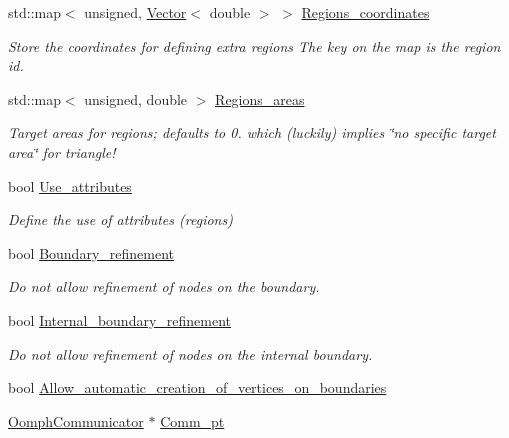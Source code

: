 \begin{DoxyCompactItemize}
std\+::map$<$ unsigned, \hyperlink{classoomph_1_1Vector}{Vector}$<$ double $>$ $>$ \hyperlink{classoomph_1_1TriangleMeshParameters_a6c1715f0b7b47ec999766afde7e85d91}{Regions\+\_\+coordinates}
\begin{DoxyCompactList}\small\item\em Store the coordinates for defining extra regions The key on the map is the region id. \end{DoxyCompactList}\item 
std\+::map$<$ unsigned, double $>$ \hyperlink{classoomph_1_1TriangleMeshParameters_acab056faae14c8124fed117bd24db277}{Regions\+\_\+areas}
\begin{DoxyCompactList}\small\item\em Target areas for regions; defaults to 0. which (luckily) implies \char`\"{}no specific target area\char`\"{} for triangle! \end{DoxyCompactList}\item 
bool \hyperlink{classoomph_1_1TriangleMeshParameters_ace3e9037373f215360c435dc85064db7}{Use\+\_\+attributes}
\begin{DoxyCompactList}\small\item\em Define the use of attributes (regions) \end{DoxyCompactList}\item 
bool \hyperlink{classoomph_1_1TriangleMeshParameters_a0a97e7b7a890c2584206eb6b584ae5f3}{Boundary\+\_\+refinement}
\begin{DoxyCompactList}\small\item\em Do not allow refinement of nodes on the boundary. \end{DoxyCompactList}\item 
bool \hyperlink{classoomph_1_1TriangleMeshParameters_a5d4823276b94bc4b3d4dbbd8d351596c}{Internal\+\_\+boundary\+\_\+refinement}
\begin{DoxyCompactList}\small\item\em Do not allow refinement of nodes on the internal boundary. \end{DoxyCompactList}\item 
bool \hyperlink{classoomph_1_1TriangleMeshParameters_abe02ff536c7f79016947f28a2ffc0b59}{Allow\+\_\+automatic\+\_\+creation\+\_\+of\+\_\+vertices\+\_\+on\+\_\+boundaries}
\item 
\hyperlink{classoomph_1_1OomphCommunicator}{Oomph\+Communicator} $\ast$ \hyperlink{classoomph_1_1TriangleMeshParameters_acf0912db2ab6a5f3f379c1839356ebd6}{Comm\+\_\+pt}
\end{DoxyCompactItemize}


